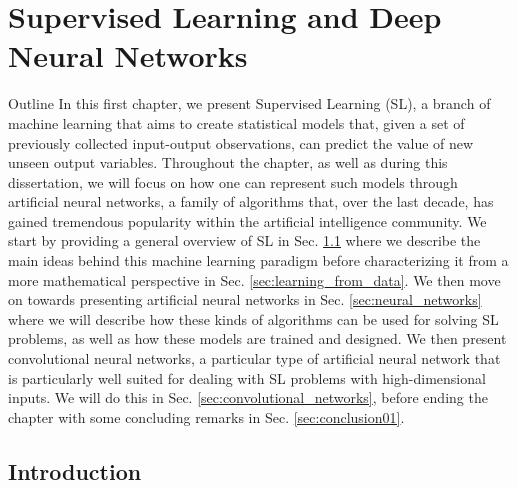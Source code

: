 \chapter{Supervised Learning and Deep Neural Networks}
\label{ch:supervised_learning}

\begin{remark}{Outline}
	In this first chapter, we present Supervised Learning (SL), a branch of machine learning that aims to create statistical models that, given a set of previously collected input-output observations, can predict the value of new unseen output variables. Throughout the chapter, as well as during this dissertation, we will focus on how one can represent such models through artificial neural networks, a family of algorithms that, over the last decade, has gained tremendous popularity within the artificial intelligence community. We start by providing a general overview of SL in Sec. \ref{sec:introduction01} where we describe the main ideas behind this machine learning paradigm before characterizing it from a more mathematical perspective in Sec. \ref{sec:learning_from_data}. We then move on towards presenting artificial neural networks in Sec. \ref{sec:neural_networks} where we will describe how these kinds of algorithms can be used for solving SL problems, as well as how these models are trained and designed. We then present convolutional neural networks, a particular type of artificial neural network that is particularly well suited for dealing with SL problems with high-dimensional inputs. We will do this in Sec. \ref{sec:convolutional_networks}, before ending the chapter with some concluding remarks in Sec. \ref{sec:conclusion01}.   
\end{remark}

\section{Introduction}
\label{sec:introduction01}

